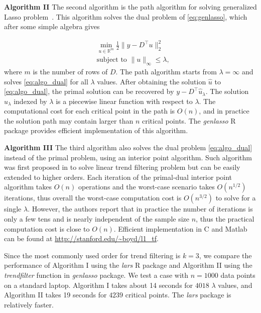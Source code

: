 \documentclass[a4paper]{article}
\newcommand{\RR}{\mathbb{R}}
\begin{document}
\textbf{Algorithm II} The second algorithm is the path algorithm for solving generalized Lasso problem~\cite{harchaoui2010multiple,tibshirani2011solution}. This algorithm solves the dual problem of \eqref{eq:genlasso}, which after some simple algebra gives

\begin{equation}
\begin{aligned}
&\min_{u\in\RR^m} \frac{1}{2}\|y-D^\top u\|_2^2\\
&\mbox{subject to } \|u\|_\infty \leq \lambda,
\label{eq:algo_dual}
\end{aligned}
\end{equation}
where $m$ is the number of rows of $D$. The path algorithm starts from $\lambda = \infty$ and solves \eqref{eq:algo_dual} for all $\lambda$ values. After obtaining the solution $\hat{u}$ to \eqref{eq:algo_dual}, the primal solution can be recovered by $y - D^\top\hat{u}_\lambda$.
The solution $\hat{u}_\lambda$ indexed by $\lambda$ is a piecewise linear function with respect to $\lambda$. The computational cost for each critical point in the path is $O(n)$, and in practice the solution path may contain larger than $n$ critical points. The \textit{genlasso} R package provides efficient implementation of this algorithm.

\textbf{Algorithm III} The third algorithm also solves the dual problem \eqref{eq:algo_dual} instead of the primal problem, using an interior point algorithm. Such algorithm was first proposed in \cite{kim2009ell_1} to solve linear trend filtering problem but can be easily extended to higher orders. Each iteration of the primal-dual interior point algorithm takes $O(n)$ operations and the worst-case scenario takes $O(n^{1/2})$ iterations, thus overall the worst-case computation cost is $O(n^{3/2})$ to solve for a single $\lambda$. However, the authors report that in practice the number of iterations is only a few tens and is nearly independent of the sample size $n$, thus the practical computation cost is close to $O(n)$. Efficient implementation in C and Matlab can be found at \url{http://stanford.edu/~boyd/l1_tf}. 

Since the most commonly used order for trend filtering is $k = 3$, we compare the performance of Algorithm I using the \textit{lars} R package and Algorithm II using the \textit{trendfilter} function in \textit{genlasso} package. We test a case with $n = 1000$ data points on a standard laptop. Algorithm I takes about 14 seconds for $4018$ $\lambda$ values, and Algorithm II takes 19 seconds for $4239$ critical points. The \textit{lars} package is relatively faster. 
\end{document}
